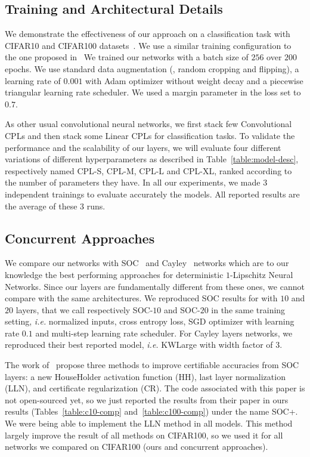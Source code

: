 \subsection{Training and Architectural Details}
\label{sec:setting-xp}

We demonstrate the effectiveness of our approach on a classification task with CIFAR10 and CIFAR100 datasets~\citep{krizhevsky2009learning}. We use a similar training configuration to the one proposed in~\citep{trockman2021orthogonalizing}
We trained our networks with a batch size of $256$ over $200$ epochs.
We use standard data augmentation (\ie, random cropping and flipping), a learning rate of $0.001$ with Adam optimizer \citep{diederik2014adam} without weight decay and a piecewise triangular learning rate scheduler. We used a margin parameter in the loss set to $0.7$.

As other usual convolutional neural networks, we first stack few Convolutional CPLs and then stack some Linear CPLs for classification tasks. To validate the performance  and the scalability of our layers,  we will evaluate four different variations of different hyperparameters as described in Table~\ref{table:model-desc}, respectively named CPL-S, CPL-M, CPL-L and CPL-XL, ranked according to the number of parameters they have. In all our experiments, we made $3$ independent trainings to evaluate accurately the models. All reported results are the average of these $3$ runs.

\subsection{Concurrent Approaches} We compare our networks with SOC~\citep{skew2021sahil} and Cayley~\cite{trockman2021orthogonalizing} networks which are to our knowledge the best performing approaches for deterministic $1$-Lipschitz Neural Networks. Since our layers are fundamentally different from these ones, we cannot compare with the same architectures. We reproduced SOC results for with $10$ and $20$ layers, that we call respectively SOC-$10$ and SOC-$20$ in the same training setting, \emph{i.e.} normalized inputs, cross entropy loss, SGD optimizer with learning rate $0.1$ and multi-step learning rate scheduler. For Cayley layers networks, we reproduced their best reported model, \emph{i.e.} KWLarge with width factor of $3$. 

The work of~\citet{singla2021householder} propose three methods to improve certifiable accuracies from SOC layers: a new HouseHolder activation function (HH),  last layer normalization (LLN), and certificate regularization (CR). The code associated with this paper is not open-sourced yet, so we just reported the results from their paper in ours results (Tables~\ref{table:c10-comp} and~\ref{table:c100-comp}) under the name SOC+. We were being able to implement the LLN method in all models. This method largely improve the result of all methods on CIFAR100, so we used it for all networks we compared on CIFAR100 (ours and concurrent approaches).


